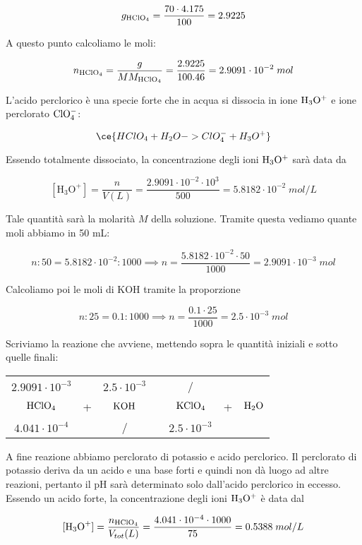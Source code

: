 $$g_{\rm HClO_4}=\frac{70 \cdot 4.175}{100}=2.9225$$

A questo punto calcoliamo le moli:

$$n_{\rm HClO_4}
=\frac{g}{MM_{\rm HClO_4}}
=\frac{2.9225}{100.46}=2.9091 \cdot 10^{-2}\;mol$$

L'acido perclorico è una specie forte che in acqua si dissocia in ione $\rm H_3O^+$ e ione perclorato $\rm ClO_4^-$:

$$\ce{HClO_4 + H_2O -> ClO_4^- + H_3O^+}$$

Essendo totalmente dissociato, la concentrazione degli ioni $\rm H_3O^+$ sarà data da

$$[\text{H}_3\text{O}^+]=\frac{n}{V(L)}=\frac{2.9091 \cdot 10^{-2} \cdot 10^{3}}{500}=5.8182 \cdot 10^{-2}\;mol/L$$

Tale quantità sarà la molarità $M$ della soluzione. Tramite questa vediamo quante moli abbiamo in 50 mL:

$$n:50=5.8182 \cdot 10^{-2}:1000
\implies
n=\frac{5.8182 \cdot 10^{-2} \cdot 50}{1000}
=2.9091 \cdot 10^{-3}\;mol$$

Calcoliamo poi le moli di KOH tramite la proporzione

$$n:25=0.1:1000
\implies
n=\frac{0.1 \cdot 25}{1000}
=2.5 \cdot 10^{-3}\;mol$$

Scriviamo la reazione che avviene, mettendo sopra le quantità iniziali e sotto quelle finali:

\begin{center}
    \begin{tabular}{ccccccc}
        $2.9091 \cdot 10^{-3}$ &  & $2.5 \cdot 10^{-3}$ & & / &&\\
        $\rm HClO_4$ & + & $\rm KOH$ & \ce{->} & $\rm KClO_4$ & + & $\rm H_2O$\\
        $4.041 \cdot 10^{-4}$ &  & / & & $2.5 \cdot 10^{-3}$ &&\\
    \end{tabular}
\end{center}

A fine reazione abbiamo perclorato di potassio e acido perclorico. Il perclorato di potassio deriva da un acido e una base forti e quindi non dà luogo ad altre reazioni, pertanto il pH sarà determinato solo dall'acido perclorico in eccesso. Essendo un acido forte, la concentrazione degli ioni $\rm H_3O^+$ è data dal

$$[\text{H}_3\text{O}^+]=\frac{n_{\rm HClO_4}}{V_{tot}(L)}=\frac{4.041 \cdot 10^{-4} \cdot 1000}{75}=0.5388\;mol/L$$

